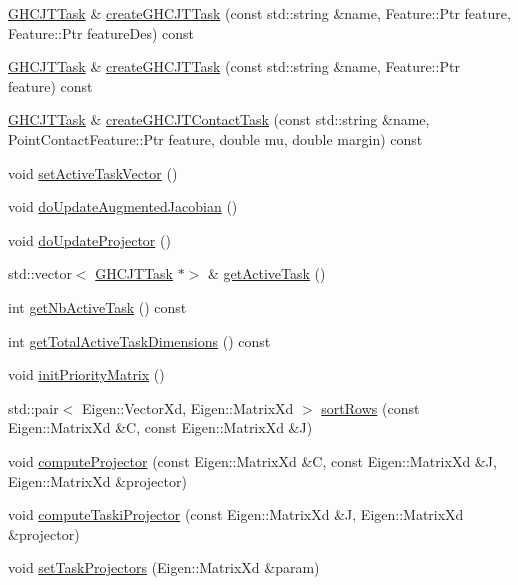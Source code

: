 \begin{DoxyCompactItemize}
\item 
\hyperlink{classgocra_1_1GHCJTTask}{G\+H\+C\+J\+T\+Task} \& \hyperlink{classgocra_1_1GHCJTController_a609068ec5ce8fe8afc2f8931aa116c0a}{create\+G\+H\+C\+J\+T\+Task} (const std\+::string \&name, Feature\+::\+Ptr feature, Feature\+::\+Ptr feature\+Des) const
\item 
\hyperlink{classgocra_1_1GHCJTTask}{G\+H\+C\+J\+T\+Task} \& \hyperlink{classgocra_1_1GHCJTController_a07f86a1549a1c14050b25a81c7cec210}{create\+G\+H\+C\+J\+T\+Task} (const std\+::string \&name, Feature\+::\+Ptr feature) const
\item 
\hyperlink{classgocra_1_1GHCJTTask}{G\+H\+C\+J\+T\+Task} \& \hyperlink{classgocra_1_1GHCJTController_aefa4677e1ee240157074bfc166d030c1}{create\+G\+H\+C\+J\+T\+Contact\+Task} (const std\+::string \&name, Point\+Contact\+Feature\+::\+Ptr feature, double mu, double margin) const
\item 
void \hyperlink{classgocra_1_1GHCJTController_aaee75cf0731450ec268d0dbcfb3504c3}{set\+Active\+Task\+Vector} ()
\item 
void \hyperlink{classgocra_1_1GHCJTController_ad15bf75052d51753ba0454e040dac8dc}{do\+Update\+Augmented\+Jacobian} ()
\item 
void \hyperlink{classgocra_1_1GHCJTController_a5d54c1726d3b72f04f0a1e9cffd91bde}{do\+Update\+Projector} ()
\item 
std\+::vector$<$ \hyperlink{classgocra_1_1GHCJTTask}{G\+H\+C\+J\+T\+Task} $\ast$$>$ \& \hyperlink{classgocra_1_1GHCJTController_a159c5708a2da97b1b8669a6dc586f8bf}{get\+Active\+Task} ()
\item 
int \hyperlink{classgocra_1_1GHCJTController_a9c72545e3995937ae9448428ccce210b}{get\+Nb\+Active\+Task} () const
\item 
int \hyperlink{classgocra_1_1GHCJTController_a7089de05269c8d2ded61640d3ae485b1}{get\+Total\+Active\+Task\+Dimensions} () const
\item 
void \hyperlink{classgocra_1_1GHCJTController_a259208518d68271b441369d1538fe362}{init\+Priority\+Matrix} ()
\item 
std\+::pair$<$ Eigen\+::\+Vector\+Xd, Eigen\+::\+Matrix\+Xd $>$ \hyperlink{classgocra_1_1GHCJTController_a5ef80e1ba5c3b2d14352fe06ba7b20e4}{sort\+Rows} (const Eigen\+::\+Matrix\+Xd \&C, const Eigen\+::\+Matrix\+Xd \&J)
\item 
void \hyperlink{classgocra_1_1GHCJTController_ab06ee2982ac337cdad4d11fe2a570e94}{compute\+Projector} (const Eigen\+::\+Matrix\+Xd \&C, const Eigen\+::\+Matrix\+Xd \&J, Eigen\+::\+Matrix\+Xd \&projector)
\item 
void \hyperlink{classgocra_1_1GHCJTController_a7c544e46be7f415675f68f3c4fe6be93}{compute\+Taski\+Projector} (const Eigen\+::\+Matrix\+Xd \&J, Eigen\+::\+Matrix\+Xd \&projector)
\item 
void \hyperlink{classgocra_1_1GHCJTController_a517d7603b3506a09ec7c5ed9b22bd7a9}{set\+Task\+Projectors} (Eigen\+::\+Matrix\+Xd \&param)
\end{DoxyCompactItemize}
